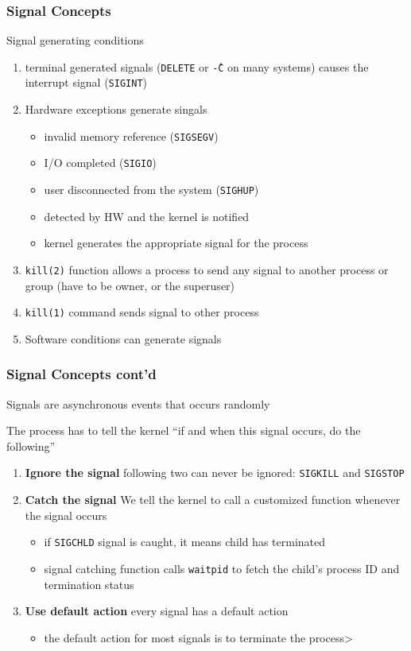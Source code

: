 \documentclass[newPxFont,sthlmFooter,nooffset]{beamer}
\begin{document}
\begin{frame}[t]
  \frametitle{Signal Concepts}
Signal generating conditions
\begin{enumerate}
\item <1-> terminal generated signals (\texttt{DELETE} or \texttt{\^-C} on many systems) causes the interrupt signal (\texttt{SIGINT})
\item <2-> Hardware exceptions generate singals
  \begin{itemize}
  \item <2-> invalid memory reference (\texttt{SIGSEGV})
  \item <2-> I/O completed (\texttt{SIGIO})
  \item <2-> user disconnected from the system (\texttt{SIGHUP})
  \item <2-> detected by HW and the kernel is notified
  \item <2-> kernel generates the appropriate signal for the process
  \end{itemize}
\item <3-> \texttt{kill(2)} function allows a process to send any signal to another process or group (have to be owner, or the superuser)
\item <4-> \texttt{kill(1)} command sends signal to other process
\item <5-> Software conditions can generate signals
\end{enumerate}

\end{frame}

\begin{frame}
  \frametitle{Signal Concepts cont'd}
Signals are asynchronous events that occurs randomly

The process has to tell the kernel ``if and when this signal occurs, do the following''

\begin{enumerate}
\item <2-> \textbf{Ignore the signal} following two can never be ignored: \texttt{SIGKILL} and \texttt{SIGSTOP} 
\item <3-> \textbf{Catch the signal} We tell the kernel to call a customized function whenever the signal occurs
  \begin{itemize}
  \item <3-> if \texttt{SIGCHLD} signal is caught, it means child has terminated
  \item <3-> signal catching function calls \texttt{waitpid} to fetch the child's process ID and termination status
  \end{itemize}
\item <4-> \textbf{Use default action} every signal has a default action
  \begin{itemize}
  \item <4-> the default action for most signals is to terminate the process> 
  \end{itemize}
\end{enumerate}

\end{frame}
\end{document}
